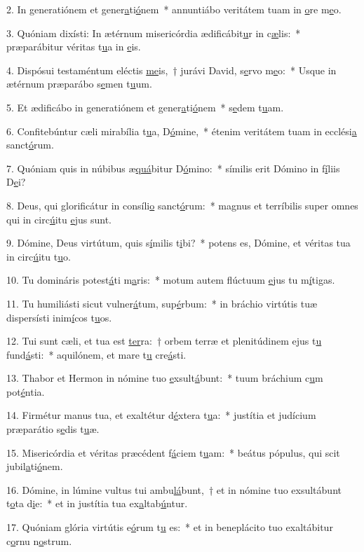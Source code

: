 2. In generatiónem et gener\uline{a}ti\uline{ó}nem~* annuntiábo veritátem tuam in \uline{o}re m\uline{e}o.\par 
3. Quóniam dixísti: In ætérnum misericórdia ædificábit\uline{u}r in c\uline{æ}lis:~* præparábitur véritas t\uline{u}a in \uline{e}is.\par 
4. Dispósui testaméntum eléctis \uline{me}is,~† jurávi David, s\uline{e}rvo m\uline{e}o:~* Usque in ætérnum præparábo s\uline{e}men t\uline{u}um.\par 
5. Et ædificábo in generatiónem et gener\uline{a}ti\uline{ó}nem~* s\uline{e}dem t\uline{u}am.\par 
6. Confitebúntur cæli mirabília t\uline{u}a, D\uline{ó}mine,~* étenim veritátem tuam in ecclési\uline{a} sanct\uline{ó}rum.\par 
7. Quóniam quis in núbibus æ\uline{quá}bitur D\uline{ó}mino:~* símilis erit Dómino in f\uline{í}liis D\uline{e}i?\par 
8. Deus, qui glorificátur in consíli\uline{o} sanct\uline{ó}rum:~* magnus et terríbilis super omnes qui in circ\uline{ú}itu \uline{e}jus sunt.\par 
9. Dómine, Deus virtútum, quis s\uline{í}milis t\uline{i}bi?~* potens es, Dómine, et véritas tua in circ\uline{ú}itu t\uline{u}o.\par 
10. Tu domináris potest\uline{á}ti m\uline{a}ris:~* motum autem flúctuum \uline{e}jus tu m\uline{í}tigas.\par 
11. Tu humiliásti sicut vulner\uline{á}tum, sup\uline{é}rbum:~* in bráchio virtútis tuæ dispersísti inim\uline{í}cos t\uline{u}os.\par 
12. Tui sunt cæli, et tua est \uline{ter}ra:~† orbem terræ et plenitúdinem ejus t\uline{u} fund\uline{á}sti:~* aquilónem, et mare t\uline{u} cre\uline{á}sti.\par 
13. Thabor et Hermon in nómine tuo \uline{e}xsult\uline{á}bunt:~* tuum bráchium c\uline{u}m pot\uline{é}ntia.\par 
14. Firmétur manus tua, et exaltétur d\uline{é}xtera t\uline{u}a:~* justítia et judícium præparátio s\uline{e}dis t\uline{u}æ.\par 
15. Misericórdia et véritas præcédent f\uline{á}ciem t\uline{u}am:~* beátus pópulus, qui scit jubil\uline{a}ti\uline{ó}nem.\par 
16. Dómine, in lúmine vultus tui ambu\uline{lá}bunt,~† et in nómine tuo exsultábunt t\uline{o}ta d\uline{i}e:~* et in justítia tua ex\uline{a}ltab\uline{ú}ntur.\par 
17. Quóniam glória virtútis e\uline{ó}rum t\uline{u} es:~* et in beneplácito tuo exaltábitur c\uline{o}rnu n\uline{o}strum.\par 
